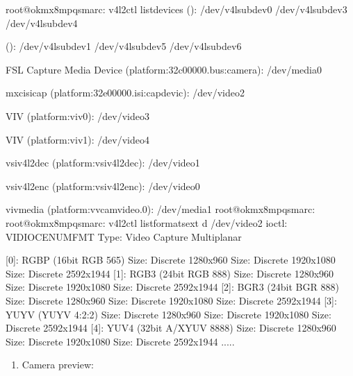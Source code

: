 \documentclass[letterpaper,10pt,openany,english]{sphinxmanual}
\begin{document}
\begin{sphinxVerbatim}[commandchars=\\\{\}]
root@ok\PYGZhy{}mx8mpq\PYGZhy{}smarc:\PYGZti{}\PYGZsh{} v4l2\PYGZhy{}ctl \PYGZhy{}\PYGZhy{}list\PYGZhy{}devices
 ():
        /dev/v4l\PYGZhy{}subdev0
        /dev/v4l\PYGZhy{}subdev3
        /dev/v4l\PYGZhy{}subdev4

 ():
        /dev/v4l\PYGZhy{}subdev1
        /dev/v4l\PYGZhy{}subdev5
        /dev/v4l\PYGZhy{}subdev6

FSL Capture Media Device (platform:32c00000.bus:camera):
        /dev/media0

mxc\PYGZhy{}isi\PYGZhy{}cap (platform:32e00000.isi:cap\PYGZus{}devic):
        /dev/video2

VIV (platform:viv0):
        /dev/video3

VIV (platform:viv1):
        /dev/video4

vsi\PYGZus{}v4l2dec (platform:vsi\PYGZus{}v4l2dec):
        /dev/video1

vsi\PYGZus{}v4l2enc (platform:vsi\PYGZus{}v4l2enc):
        /dev/video0

viv\PYGZus{}media (platform:vvcam\PYGZhy{}video.0):
        /dev/media1
root@ok\PYGZhy{}mx8mpq\PYGZhy{}smarc:\PYGZti{}\PYGZsh{} 
root@ok\PYGZhy{}mx8mpq\PYGZhy{}smarc:\PYGZti{}\PYGZsh{} v4l2\PYGZhy{}ctl \PYGZhy{}\PYGZhy{}list\PYGZhy{}formats\PYGZhy{}ext \PYGZhy{}d /dev/video2
ioctl: VIDIOC\PYGZus{}ENUM\PYGZus{}FMT
        Type: Video Capture Multiplanar

        [0]: \PYGZsq{}RGBP\PYGZsq{} (16\PYGZhy{}bit RGB 5\PYGZhy{}6\PYGZhy{}5)
                Size: Discrete 1280x960
                Size: Discrete 1920x1080
                Size: Discrete 2592x1944
[1]: \PYGZsq{}RGB3\PYGZsq{} (24\PYGZhy{}bit RGB 8\PYGZhy{}8\PYGZhy{}8)
                Size: Discrete 1280x960
                Size: Discrete 1920x1080
                Size: Discrete 2592x1944
        [2]: \PYGZsq{}BGR3\PYGZsq{} (24\PYGZhy{}bit BGR 8\PYGZhy{}8\PYGZhy{}8)
                Size: Discrete 1280x960
                Size: Discrete 1920x1080
                Size: Discrete 2592x1944
        [3]: \PYGZsq{}YUYV\PYGZsq{} (YUYV 4:2:2)
                Size: Discrete 1280x960
                Size: Discrete 1920x1080
                Size: Discrete 2592x1944
        [4]: \PYGZsq{}YUV4\PYGZsq{} (32\PYGZhy{}bit A/XYUV 8\PYGZhy{}8\PYGZhy{}8\PYGZhy{}8)
                Size: Discrete 1280x960
                Size: Discrete 1920x1080
                Size: Discrete 2592x1944
.....
\end{sphinxVerbatim}
\begin{enumerate}
%
\item {} 
\sphinxAtStartPar
Camera preview:

\end{enumerate}
\end{document}
